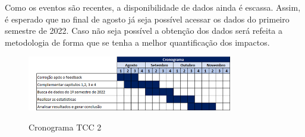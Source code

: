 \documentclass[12pt]{article}
\begin{document}
Como os eventos são recentes, a disponibilidade de dados ainda é escassa. Assim, é esperado que no final de agosto já seja possível acessar os dados do primeiro semestre de 2022. Caso não seja possível a obtenção dos dados será refeita a metodologia de forma que se tenha a melhor quantificação dos impactos.

\begin{figure}[H]
    \begin{center}
        \caption{Cronograma TCC 2}
        \includegraphics[width=0.8\textwidth]{cronograma tcc2.png}
        \label{crognograma}
    \end{center}
\end{figure}


\pagebreak

\end{document}
